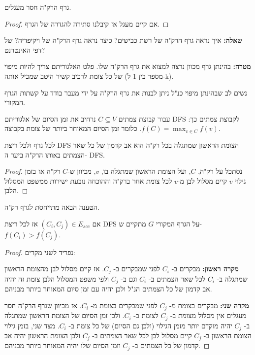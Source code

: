 \begin{observation}
גרף הרק"ה חסר מעגלים.
\end{observation}
\begin{proof}
אם קיים מעגל אז קיבלנו סתירה להגדרה של הגרף.

\end{proof}

\textbf{שאלה:}
איך נראה גרף הרק"ה של רשת כבישים? כיצד נראה גרף הרק"ה של ויקיפדיה? של דפי האינטרנט?

\textbf{מטרה:}
בהינתן גרף מכוון נרצה למצוא את גרף הרק"ה שלו.
פלט האלגוריתם צריך להיות מיפוי של כל צומת לרכיב קשיר היטב שמכיל אותה (מספר בין 1 ל-k).

נשים לב שבהינתן מיפוי כנ"ל ניתן לבנות את גרף הרק"ה על ידי מעבר בודד על קשתות הגרף המקורי.



עבור קבוצת צמתים
$C \subseteq V$
נרחיב את זמן הסיום של אלגוריתם
\textenglish{DFS}
לקבוצת צמתים כך:
$f(C) = \max_{v \in C}f(v)$.
כלומר זמן הסיום המאוחר ביותר של צומת בקבוצה.


\begin{claim}
לכל גרף ולכל ריצת 
\textenglish{DFS}
הצומת הראשון שמתגלה בכל רק"ה הוא אב קדמון של כל שאר הצמתים באותו הרק"ה ביער ה-%
\textenglish{DFS}.
\end{claim}

\begin{proof}
נסתכל על רק"ה, $C$, ועל הצומת הראשון שמתגלה בו, $v$,
מכיוון ש-$C$ רק"ה אז בזמן גילוי $v$ קיים מסלול לבן מ-$v$ לכל צומת אחר ברק"ה וההוכחה
נובעת ישירות ממשפט המסלול הלבן.
\end{proof}
הטענה הבאה מתייחסת לגרף רק"ה.
\begin{claim}
אם
$(C_i,C_j) \in E_{scc}$
אז לכל ריצת 
\textenglish{DFS}
על הגרף המקורי $G$ מתקיים ש-%
$f(C_i) > f(C_j)$.
\end{claim}

\begin{proof}
נפריד לשני מקרים:

\textbf{מקרה ראשון:}
מבקרים ב-%
$C_i$
לפני שמבקרים ב-%
$C_j$.
אז קיים מסלול לבן מהצומת הראשון שמתגלה ב-%
$C_i$
לכל שאר הצמתים ב-%
$C_i$
וגם ב-%
$C_j$
ולפי משפט המסלול הלבן צומת זה יהיה אב קדמון של כל הצמתים הנ"ל ולכן יהיה עם זמן סיום המאוחר 
ביותר מבניהם.

\textbf{מקרה שני:}
מבקרים בצומת מ-%
$C_j$
לפני שמבקרים בצומת מ-%
$C_i$.
אז מכיוון שגרף הרק"ה חסר מעגלים אין מסלול מצומת ב-%
$C_j$
לצומת ב-%
$C_i$.
ולכן זמן הסיום של הצומת הראשון שמתגלה ב-%
$C_j$
יהיה מוקדם יותר מזמן הגילוי (ולכן גם הסיום) של כל צומת ב-%
$C_i$.
מצד שני, בזמן גילוי הצומת הראשון ב-%
$C_j$
קיים מסלול לבן לכל שאר הצמתים ב-%
$C_j$
ולכן הצומת הראשון יהיה אב קדמון של כל הצמתים ב-%
$C_j$
וזמן הסיום שלו יהיה המאוחר ביותר מבניהם.
\end{proof}

